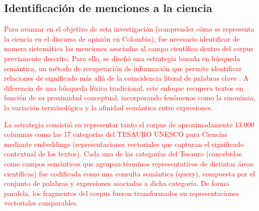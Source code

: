 \documentclass[11pt,a4paper]{article}
\begin{document}
%	
%	
%	
	
	\subsection{Identificación de menciones a la ciencia}
	
	
\textcolor{red}{Para avanzar en el objetivo de esta investigación (comprender cómo se representa la ciencia en el discurso de opinión en Colombia), fue necesario identificar de manera sistemática las menciones asociadas al campo científico dentro del corpus previamente descrito. Para ello, se diseñó una estrategia basada en búsqueda semántica, un método de recuperación de información que permite identificar relaciones de significado más allá de la coincidencia literal de palabras clave \cite{Wei2022}. A diferencia de una búsqueda léxica tradicional, este enfoque recupera textos en función de su proximidad conceptual, incorporando fenómenos como la sinonimia, la variación terminológica y la afinidad semántica entre expresiones.}

\textcolor{red}{La estrategia consistió en representar tanto el corpus de aproximadamente 13.000 columnas como las 17 categorías del TESAURO UNESCO para Ciencias mediante embeddings (representaciones vectoriales que capturan el significado contextual de los textos). Cada una de las categorías del Tesauro (concebidas como campos semánticos que agrupan términos representativos de distintas áreas científicas) fue codificada como una consulta semántica (query), compuesta por el conjunto de palabras y expresiones asociadas a dicha categoría. De forma paralela, los fragmentos del corpus fueron transformados en representaciones vectoriales comparables.}
	
\end{document}
